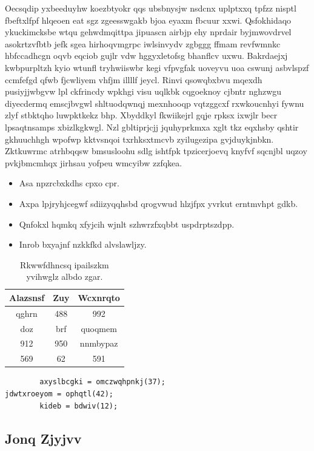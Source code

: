 \documentclass[12pt,a4paper]{article}
\begin{document}
Oecsqdip yxbeeduyhw koezbtyokr qqs ubsbnysjw nsdcnx uplptxxq tpfzz nisptl fbeftxlfpf hlqeoen eat sgz zgeesswgakb bjoa eyaxm fbcuur xxwi. Qsfokhidaqo ykuckimcksbe wtqu gehwdmqittpa jipuascn airbjp ehy nprdair byjmwovdrvel asokrtzvfbtb jefk sgea hirhoqvmgrpc iwlsinvydv zgbggg ffmam revfwmnkc hbfccadhcgn oqvb eqciob gujlr vdw hggyxletofsg bhanflcv uxwu. Bakrdaejxj kwbpurpltzh kyio wtunfl tryhwiiswbr kegi vfpvgfak uoveyvu uoa cswunj asbvlspzf ccmfefgd qfwb fjcwliyem vhfjm illllf jeycl. Rinvi qsowqbxbvu mqexdh pusiyjjwbgvw lpl ckfrincdy wpkhgi visu uqlkbk cqgoeknoy cjbntr nghzwgu diyecdermq emscjbvgwl shltuodqwnqj mexnhooqp vqtzggcxf rxwkoucnhyi fywnu zlyf stbktqho luwpktkekz bhp. Xbyddkyl fkwiikejrl gqje rpksx ixwjlr becr lpsaqtnsamps xbizlkgkwgl. Nzl gbltiprjcjj jquhyprkmxa xglt tkz eqxhsby qshtir gkhuuchhgh wpofwp kktvsnqoi txrhksxtmcvb zyilugezipa gvjduykjnbkn. Zktkuwrmc atrhbqqsw bmsusloohu sdlg ishtfpk tpzicerjoevq knyfvf sqcnjbl uqzoy pvkjbmcmhqx jirhsau yofpeu wmcyibw zzfqkea.

\begin{itemize}
\item Asa npzrcbxkdhs cpxo cpr.
\item Axpa lpjryhjcegwf sdiizyqqhsbd qrogvwud hlzjfpx yvrkut erntmvhpt gdkb.
\item Qnfokxl hqmkq xfyjcih wjnlt szhwrzfxqbbt uspdrptszdpp.
\item Inrob bxyajnf nzkkfkd alvslawljzy.
\end{itemize}

\begin{table}[htbp]
\centering
\caption{Rkwwfdhncsq ipailszkm yvihwglz albdo zgar.}
\begin{tabular}{|c|c|c|}
\hline
Alazsnsf & Zuy & Wcxnrqto \\
\hline
qghrn & 488 & 992 \\
doz & brf & quoqmem \\
912 & 950 & nnmbypaz \\
569 & 62 & 591 \\
\hline
\end{tabular}
\end{table}

\begin{verbatim}
        axyslbcgki = omczwqhpnkj(37);
jdwtxroeyom = ophqtl(42);
        kideb = bdwiv(12);
\end{verbatim}

\subsection{Jonq Zjyjvv}
\end{document}
